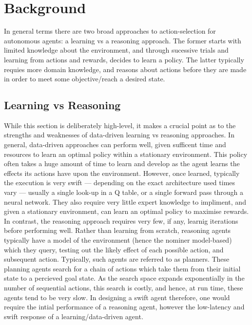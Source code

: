 \section{Background}\label{Background}
In general terms there are two broad approaches to action-selection for autonomous agents: a learning vs a reasoning approach. The former starts with limited knowledge about the environment, and through sucessive trials and learning from actions and rewards, decides to learn a policy. The latter typically requies more domain knowledge, and reasons about actions before they are made in order to meet some objective/reach a desired state. 
\subsection{Learning vs Reasoning}
While this section is deliberately high-level, it makes a crucial point as to the strengths and weaknesses of data-driven learning vs reasoning approaches. In general, data-driven approaches can perform well, given sufficent time and resources to learn an optimal policy within a stationary environment. This policy often takes a huge amount of time to learn and develop as the agent learns the effects its actions have upon the environment. However, once learned, typically the execution is very swift --- depending on the exact architecture used times vary --- usually a single look-up in a Q table, or a single forward pass through a neural network. They also require very little expert knowledge to impliment, and given a stationary environment, can learn an optimal policy to maximise rewards. 
\newline \newline
In contrast, the reasoning approach requires very few, if any, learnig iterations before performing well. Rather than learning from scratch, reasoning agents typically have a model of the environment (hence the nominer model-based) which they query, testing out the likely effect of each possible action, and subsequent action. Typically, such agents are referred to as planners. These planning agents search for a chain of actions which take them from their initial state to a percieved goal state. As the search space expands exponentially in the number of sequential actions, this search is costly, and hence, at run time, these agents tend to be very slow. 
\newline\newline
In designing a swift agent therefore, one would require the intial performance of a reasoning agent, however the low-latency and swift response of a learning/data-driven agent. 
